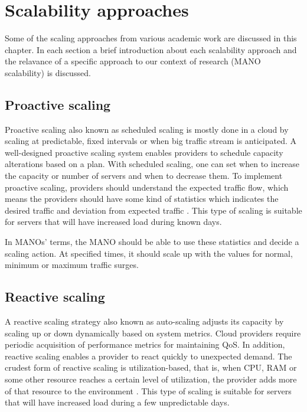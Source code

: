 \chapter{Scalability approaches}
\label{ch:Scalability Approaches}

Some of the scaling approaches from various academic work are discussed in this chapter. In each section a brief introduction about each  scalability approach and the relavance of a specific approach to our context of research (MANO scalability) is discussed.


\section{Proactive scaling}

Proactive scaling also known as scheduled scaling is mostly done in a cloud by scaling at predictable, fixed intervals or when big traffic stream is anticipated. A well-designed proactive scaling system enables providers to schedule capacity alterations based on a plan.
With scheduled scaling, one can set when to increase the capacity or number of servers and when to decrease them. To implement proactive scaling, providers should understand  the expected traffic flow, which means the providers should have some kind of statistics which indicates the desired traffic and deviation from expected traffic \cite{falatah_cloud_2014}\cite{reese_cloud_nodate}. This type of scaling is suitable for servers that will have increased load during known days.

In MANOs' terms, the MANO should be able to use these statistics and decide a scaling action. At specified times, it should scale up with the values for normal, minimum or maximum traffic surges.


\section{Reactive scaling}

A reactive scaling strategy also known as auto-scaling adjusts its capacity by scaling up or down dynamically based on system metrics.
Cloud providers require periodic acquisition of performance metrics for maintaining QoS. In addition, reactive scaling enables a provider to react quickly to unexpected demand. The crudest form of reactive scaling is utilization-based, that is, when  CPU, RAM  or some other resource reaches a certain level of  utilization, the provider adds  more of that resource to the environment \cite{falatah_cloud_2014}\cite{reese_cloud_nodate}. This type of scaling is suitable for servers that will have increased load during a few unpredictable days.

